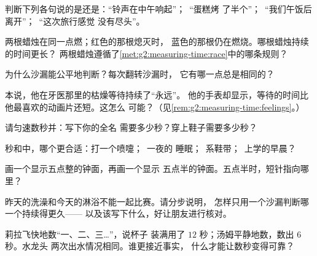 \begin{exercise}[$\star$]\label{exo:g2:measuring-time:2}
判断下列各句说的是还是：“铃声在中午响起”；\ “蛋糕烤
了半个”；\ “我们午饭后离开”；\ “这次旅行感觉
没有尽头”。
\end{exercise}

\begin{exercise}[$\star$]\label{exo:g2:measuring-time:3}
两根蜡烛在同一点燃；红色的那根熄灭时，
蓝色的那根仍在燃烧。哪根蜡烛持续的时间更长？
两根蜡烛遵循了\cref{met:g2:measuring-time:race}中的哪条规则？
\end{exercise}

\begin{exercise}[$\star$]\label{exo:g2:measuring-time:4}
为什么沙漏能公平地判断？每次翻转沙漏时，
它有哪一点总是相同的？
\end{exercise}

\begin{exercise}[$\star$]\label{exo:g2:measuring-time:5}
本说，他在牙医那里的枯燥等待持续了“永远”。
他的手表却显示，等待的时间比他最喜欢的动画片还短。这怎么
可能？（见\cref{rem:g2:measuring-time:feelings}。）
\end{exercise}

\begin{exercise}[$\star$]\label{exo:g2:measuring-time:6}
请匀速数秒并：写下你的全名
需要多少秒？穿上鞋子需要多少秒？
\end{exercise}

\begin{exercise}[$\star$]\label{exo:g2:measuring-time:7}
秒和中，哪个更合适：打一个喷嚏；\ 一夜的
睡眠；\ 系鞋带；\ 上学的早晨？
\end{exercise}

\begin{exercise}[$\star$]\label{exo:g2:measuring-time:8}
画一个显示五点整的钟面，再画一个显示
五点半的钟面。五点半时，短针指向哪里？
\end{exercise}

\begin{exercise}[$\star\star$]\label{exo:g2:measuring-time:9}
昨天的洗澡和今天的淋浴不能一起比赛。请分步说明，
怎样只用一个沙漏判断哪一个持续得更久——
以及该写下什么，好让朋友进行核对。
\end{exercise}

\begin{exercise}[$\star\star$]\label{exo:g2:measuring-time:10}
莉拉飞快地数“一、二、三\dots”，说杯子
装满用了 $12$ 秒；汤姆平静地数，数出 $6$ 秒。水龙头
两次出水情况相同。谁更接近事实，
什么才能让数秒变得可靠？
\end{exercise}
